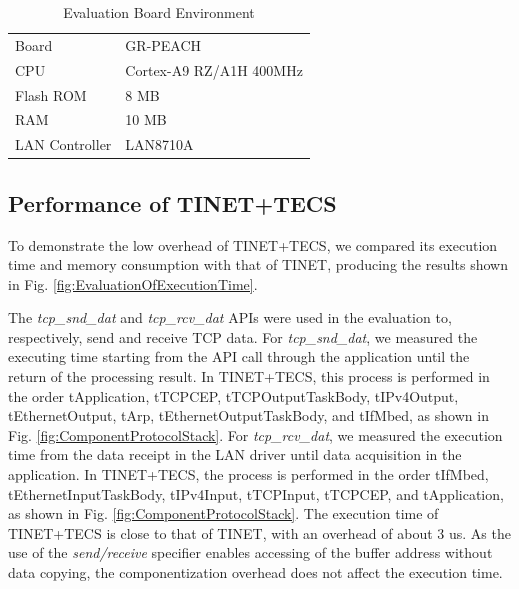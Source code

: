 \documentclass[JIP]{ipsj_v2/UTF8/ipsj}
\begin{document}
\begin{table}[t]
    \centering
    \caption{Evaluation Board Environment}
    \begin{tabular}{l|l}
        \hline\hline
        Board           &   GR-PEACH                \\
        CPU             &   Cortex-A9 RZ/A1H 400MHz \\
        Flash ROM       &   8 MB                    \\
        RAM             &   10 MB                   \\
        LAN Controller  &   LAN8710A                \\
        \hline
    \end{tabular}
    \label{tab:EvaluationBoardEnvironment}
\end{table}

\subsection{Performance of TINET+TECS}

To demonstrate the low overhead of TINET+TECS, we compared its execution time and memory consumption with that of TINET, producing the results shown in Fig. \ref{fig:EvaluationOfExecutionTime}.

The {\it tcp\_snd\_dat} and {\it tcp\_rcv\_dat} APIs were used in the evaluation to, respectively, send and receive TCP data.
For {\it tcp\_snd\_dat}, we measured the executing time starting from the API call through the application until the return of the processing result.
In TINET+TECS, this process is performed in the order tApplication, tTCPCEP, tTCPOutputTaskBody, tIPv4Output, tEthernetOutput, tArp, tEthernetOutputTaskBody, and tIfMbed, as shown in Fig. \ref{fig:ComponentProtocolStack}.
For {\it tcp\_rcv\_dat}, we measured the execution time from the data receipt in the LAN driver until data acquisition in the application.
In TINET+TECS, the process is performed in the order tIfMbed, tEthernetInputTaskBody, tIPv4Input, tTCPInput, tTCPCEP, and tApplication, as shown in Fig. \ref{fig:ComponentProtocolStack}.
The execution time of TINET+TECS is close to that of TINET, with an overhead of about 3 us.
As the use of the {\it send/receive} specifier enables accessing of the buffer address without data copying, the componentization overhead does not affect the execution time.
\end{document}
